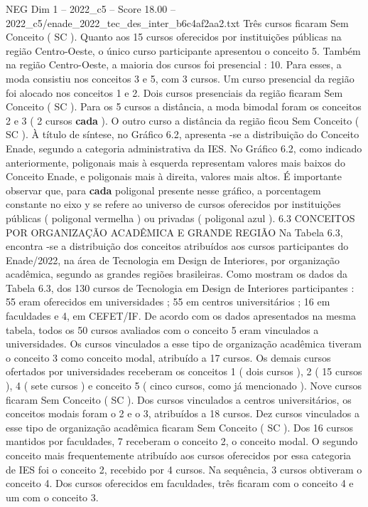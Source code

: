 \begin{textsample}{NEG Dim 1 – 2022\_c5 – Score 18.00 – 2022\_c5/enade\_2022\_tec\_des\_inter\_b6c4af2aa2.txt}
Três cursos ficaram Sem Conceito ( SC ).
Quanto aos 15 cursos oferecidos por instituições públicas na região Centro-Oeste, o único curso participante apresentou o conceito 5.
Também na região Centro-Oeste, a maioria dos cursos foi presencial : 10.
Para esses, a moda consistiu nos conceitos 3 e 5, com 3 cursos.
Um curso presencial da região foi alocado nos conceitos 1 e 2.
Dois cursos presenciais da região ficaram Sem Conceito ( SC ).
Para os 5 cursos a distância, a moda bimodal foram os conceitos 2 e 3 ( 2 cursos \textbf{cada} ).
O outro curso a distância da região ficou Sem Conceito ( SC ).
À título de síntese, no Gráfico 6.2, apresenta -se a distribuição do Conceito Enade, segundo a categoria administrativa da IES.
No Gráfico 6.2, como indicado anteriormente, poligonais mais à esquerda representam valores mais baixos do Conceito Enade, e poligonais mais à direita, valores mais altos.
É importante observar que, para \textbf{cada} poligonal presente nesse gráfico, a porcentagem constante no eixo y se refere ao universo de cursos oferecidos por instituições públicas ( poligonal vermelha ) ou privadas ( poligonal azul ). 6.3 CONCEITOS POR ORGANIZAÇÃO ACADÊMICA E GRANDE REGIÃO Na Tabela 6.3, encontra -se a distribuição dos conceitos atribuídos aos cursos participantes do Enade/2022, na área de Tecnologia em Design de Interiores, por organização acadêmica, segundo as grandes regiões brasileiras.
Como mostram os dados da Tabela 6.3, dos 130 cursos de Tecnologia em Design de Interiores participantes : 55 eram oferecidos em universidades ; 55 em centros universitários ; 16 em faculdades e 4, em CEFET/IF.
De acordo com os dados apresentados na mesma tabela, todos os 50 cursos avaliados com o conceito 5 eram vinculados a universidades.
Os cursos vinculados a esse tipo de organização acadêmica tiveram o conceito 3 como conceito modal, atribuído a 17 cursos.
Os demais cursos ofertados por universidades receberam os conceitos 1 ( dois cursos ), 2 ( 15 cursos ), 4 ( sete cursos ) e conceito 5 ( cinco cursos, como já mencionado ).
Nove cursos ficaram Sem Conceito ( SC ).
Dos cursos vinculados a centros universitários, os conceitos modais foram o 2 e o 3, atribuídos a 18 cursos.
Dez cursos vinculados a esse tipo de organização acadêmica ficaram Sem Conceito ( SC ).
Dos 16 cursos mantidos por faculdades, 7 receberam o conceito 2, o conceito modal.
O segundo conceito mais frequentemente atribuído aos cursos oferecidos por essa categoria de IES foi o conceito 2, recebido por 4 cursos.
Na sequência, 3 cursos obtiveram o conceito 4.
Dos cursos oferecidos em faculdades, três ficaram com o conceito 4 e um com o conceito 3.

\end{textsample}
